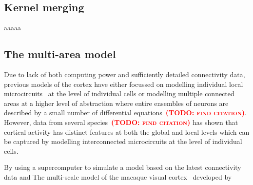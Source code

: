 \documentclass[9pt,twocolumn,twoside,lineno]{pnas-new}
\newcommand{\todo}[1]{\textbf{\textsc{\textcolor{red}{(TODO: #1)}}}}
\begin{document}
\subsection*{Kernel merging}
aaaaa

\subsection*{The multi-area model}
Due to lack of both computing power and sufficiently detailed connectivity data, previous models of the cortex have either focussed on modelling individual local microcircuits~\citep{Izhikevich2008,Potjans2012} at the level of individual cells or modelling multiple connected areas at a higher level of abstraction where entire ensembles of neurons are described by a small number of differential equations~\todo{find citation}.
However, data from several species~\todo{find citation} has shown that cortical activity has distinct features at both the global and local levels which can be captured by modelling interconnected microcircuits at the level of individual cells.

By using a supercomputer to simulate a model based on the latest connectivity data and The multi-scale model of the macaque visual cortex~\citep{Schmidt2018} developed by 
\end{document}
